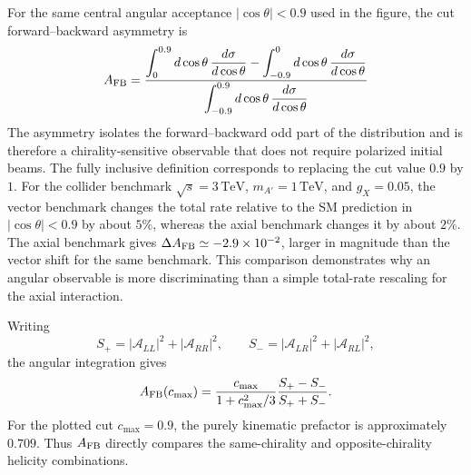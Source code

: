 \documentclass[12pt,a4paper]{article}
\begin{document}
For the same central angular acceptance \(|\cos\theta|<0.9\) used in the figure, the cut forward--backward asymmetry is
\[
A_{\rm FB}
=
\frac{\displaystyle
\int_0^{0.9}d\cos\theta\,\frac{d\sigma}{d\cos\theta}
-
\int_{-0.9}^{0}d\cos\theta\,\frac{d\sigma}{d\cos\theta}}
{\displaystyle
\int_{-0.9}^{0.9}d\cos\theta\,\frac{d\sigma}{d\cos\theta}}
\]
The asymmetry isolates the forward--backward odd part of the distribution and is therefore a chirality-sensitive observable that does not require polarized initial beams. The fully inclusive definition corresponds to replacing the cut value \(0.9\) by \(1\). For the collider benchmark \(\sqrt{s}=3\,\mathrm{TeV}\), \(m_{A'}=1\,\mathrm{TeV}\), and \(g_X=0.05\), the vector benchmark changes the total rate relative to the SM prediction in \(|\cos\theta|<0.9\) by about \(5\%\), whereas the axial benchmark changes it by about \(2\%\). The axial benchmark gives \(\Delta A_{\rm FB}\simeq-2.9\times10^{-2}\), larger in magnitude than the vector shift for the same benchmark. This comparison demonstrates why an angular observable is more discriminating than a simple total-rate rescaling for the axial interaction.



Writing
\[
S_+=|\mathcal A_{LL}|^2+|\mathcal A_{RR}|^2,\qquad
S_-=|\mathcal A_{LR}|^2+|\mathcal A_{RL}|^2,
\]
the angular integration gives
\[
A_{\rm FB}(c_{\max})
=
\frac{c_{\max}}{1+c_{\max}^2/3}
\frac{S_+-S_-}{S_++S_-}.
\]
For the plotted cut \(c_{\max}=0.9\), the purely kinematic prefactor is approximately \(0.709\). Thus \(A_{\rm FB}\) directly compares the same-chirality and opposite-chirality helicity combinations.
\end{document}
